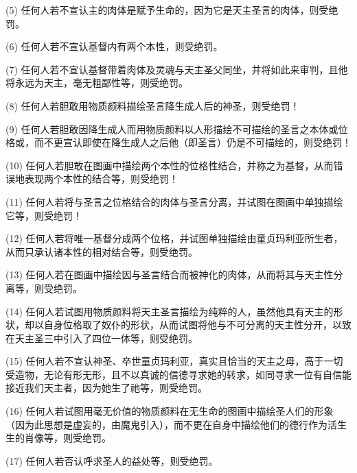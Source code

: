 (5) 任何人若不宣认主的肉体是赋予生命的，因为它是天主圣言的肉体，则受绝罚。\par

(6) 任何人若不宣认基督内有两个本性，则受绝罚。\par

(7) 任何人若不宣认基督带着肉体及灵魂与天主圣父同坐，并将如此来审判，且他将永远为天主，毫无粗鄙性等，则受绝罚。\par

(8) 任何人若胆敢用物质颜料描绘圣言降生成人后的神圣，则受绝罚！\par

(9) 任何人若胆敢因降生成人而用物质颜料以人形描绘不可描绘的圣言之本体或位格或，而不更宣认即使在降生成人之后他（即圣言）仍是不可描绘的，则受绝罚！\par

(10) 任何人若胆敢在图画中描绘两个本性的位格性结合，并称之为基督，从而错误地表现两个本性的结合等，则受绝罚！\par

(11) 任何人若将与圣言之位格结合的肉体与圣言分离，并试图在图画中单独描绘它等，则受绝罚！\par

(12) 任何人若将唯一基督分成两个位格，并试图单独描绘由童贞玛利亚所生者，从而只承认诸本性的相对结合等，则受绝罚。\par

(13) 任何人若在图画中描绘因与圣言结合而被神化的肉体，从而将其与天主性分离等，则受绝罚。\par

(14) 任何人若试图用物质颜料将天主圣言描绘为纯粹的人，虽然他具有天主的形状，却以自身位格取了奴仆的形状，从而试图将他与不可分离的天主性分开，以致在天主圣三中引入了四位一体等，则受绝罚。\par

(15) 任何人若不宣认神圣、卒世童贞玛利亚，真实且恰当的天主之母，高于一切受造物，无论有形无形，且不以真诚的信德寻求她的转求，如同寻求一位有自信能接近我们天主者，因为她生了祂等，则受绝罚。\par

(16) 任何人若试图用毫无价值的物质颜料在无生命的图画中描绘圣人们的形象（因为此思想是虚妄的，由魔鬼引入），而不更在自身中描绘他们的德行作为活生生的肖像等，则受绝罚。\par

(17) 任何人若否认呼求圣人的益处等，则受绝罚。\par

